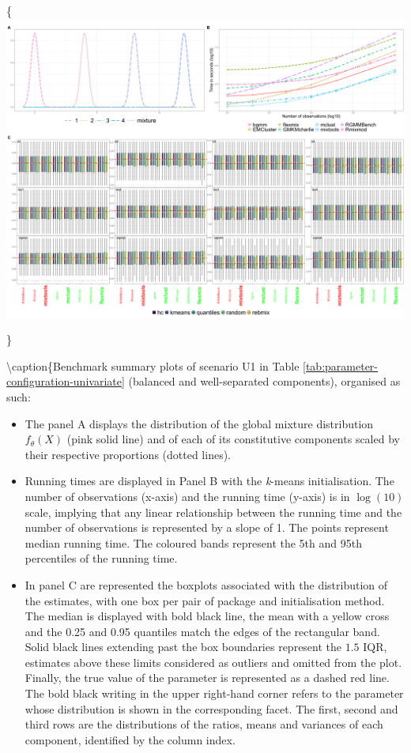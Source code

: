\{\centering \includegraphics[width=1\linewidth]{./figs/univariate/univariate_balanced_separated}

\}

\textbackslash caption\{Benchmark summary plots of scenario U1 in Table \ref{tab:parameter-configuration-univariate} (balanced and well-separated components), organised as such:

\begin{itemize}
\item The panel A displays the distribution of the global mixture distribution $f_{\theta}(X)$
(pink solid line) and of each of its constitutive components scaled by
their respective proportions (dotted lines).
\item Running times are displayed in Panel B with the \textit{k}-means initialisation. The number of observations
(x-axis) and the running time (y-axis) is in $\log(10)$ scale, implying
that any linear relationship between the running time and the number of
observations is represented by a slope of 1. The points represent median
running time. The coloured bands represent the 5th and 95th percentiles
of the running time.
\item In panel C are represented the boxplots associated with the distribution of the estimates, with one box per pair of package and initialisation method. The median is displayed with bold
black line, the mean with a yellow cross and the 0.25 and 0.95 quantiles
match the edges of the rectangular band. Solid black lines extending
past the box boundaries represent the $1.5$ IQR, estimates above these
limits considered as outliers and omitted from the plot. Finally, the
true value of the parameter is represented as a dashed red line. The bold black writing in the upper right-hand corner refers to the parameter whose distribution is shown in the corresponding facet. The first, second and third rows are the distributions of the ratios, means and variances of each component, identified by the column index.
\end{itemize}

